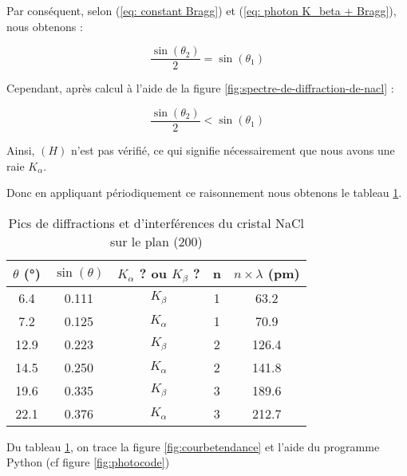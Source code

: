 Par conséquent, selon (\ref{eq: constant Bragg}) et (\ref{eq: photon K_beta + Bragg}), nous obtenons :

\begin{equation}
	\frac{\sin(\theta_{2})}{2} = \sin(\theta_{1})
\end{equation}

Cependant, après calcul à l'aide de la figure \ref{fig:spectre-de-diffraction-de-nacl} :

\begin{equation} \label{eq:Inegalite_theta}
	\frac{\sin(\theta_{2})}{2} < \sin(\theta_{1})
\end{equation}

Ainsi, $(H)$ n'est pas vérifié, ce qui signifie nécessairement que nous avons une raie $K_{\alpha}$.

\newpage
Donc en appliquant périodiquement ce raisonnement nous obtenons le tableau \ref{tab:Pic_de_diffraction_et_d'interférence_du_cristal_NaCl_sur_le_plan_200}.


\begin{table}[h!]
	\centering
	\begin{tabular}{|c|c|c|c|c|}
		\hline
		$\theta$ (°) & $\sin(\theta)$ &$K_{\alpha}$ ? ou $K_{\beta}$ ? & n & $n \times \lambda $ (pm) \\ \hline
		6.4       & 0.111      & $K_{\beta}$                     & 1 & 63.2 \\ \hline
		7.2       & 0.125      &$K_{\alpha}$                    & 1 & 70.9 \\ \hline
		12.9      & 0.223      & $K_{\beta}$                     & 2  & 126.4\\ \hline
		14.5      & 0.250      &$K_{\alpha}$                    & 2  & 141.8\\ \hline
		19.6      & 0.335      & $K_{\beta}$                     & 3  & 189.6\\ \hline
		22.1      & 0.376      &$K_{\alpha}$                    & 3  & 212.7 \\ \hline
	\end{tabular}	
	\caption{Pics de diffractions et d'interférences du cristal NaCl sur le plan (200)}
	\label{tab:Pic_de_diffraction_et_d'interférence_du_cristal_NaCl_sur_le_plan_200}
\end{table}




Du tableau \ref{tab:Pic_de_diffraction_et_d'interférence_du_cristal_NaCl_sur_le_plan_200}, on trace la figure \ref{fig:courbetendance} et l'aide du programme Python (cf figure \ref{fig:photocode})


